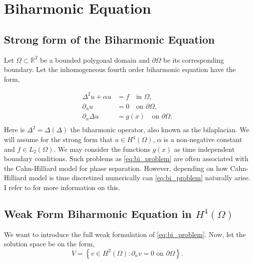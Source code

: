 \newpage
\section{ Biharmonic Equation}
\label{sec:ch1}


\subsection{Strong form of the Biharmonic Equation}%
\label{sub:strong_form_of_the_biharmonic_equation}

Let $\Omega \subset   \mathbb{R} ^2$ be a bounded polygonal domain and $\partial \Omega $ be its corresponding boundary. Let the inhomogeneous fourth order biharmonic equation have the form,

\begin{equation}
\label{eq:bi_problem}
\begin{split}
    \Delta^2  u  + \alpha  u  & = f \quad \text{in } \Omega,   \\
    \partial _{n} u & = 0  \quad \text{on } \partial \Omega,  \\
    \partial _{n} \Delta  u & = g\left( x \right)  \quad \text{on } \partial \Omega .  \\
\end{split}
\end{equation}
Here is $\Delta ^2 = \Delta  \left( \Delta  \right) $ the biharmonic operator, also known as the bilaplacian. We will assume for the strong form that $u \in H^{4}\left( \Omega  \right) $, $\alpha $ is a non-negative constant and $f \in L_{2}\left( \Omega  \right)
$. We may consider the functions $g\left( x \right) $ as time independent boundary conditions. Such problems as \eqref{eq:bi_problem} are often associated with the Cahn-Hilliard model
\cite{cahnhilliard1957} for phase separation. However, depending on how Cahn-Hilliard model is time discretized numerically can
\eqref{eq:bi_problem} naturally arise. I refer to \cite{brenner2012quadratic} for more information on this.

\subsection{  Weak Form Biharmonic Equation in $H^{4}\left( \Omega  \right) $}%
\label{sub:continious_weak_form_of_biharmonic_equation}


We want to introduce the full weak formulation of \eqref{eq:bi_problem}. Now, let the solution space be on the form,
\begin{equation*}
V = \left\{ v \in H^2\left( \Omega  \right) : \partial _{n} v = 0  \text{ on }
\partial \Omega  \right\}.
\end{equation*}

